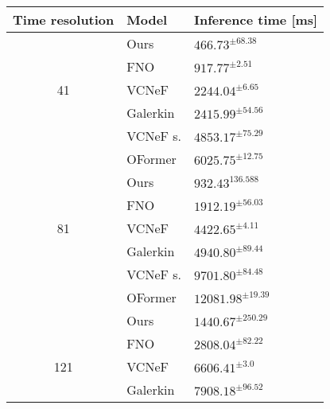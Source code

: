 \begin{table}[]
\begin{tabular}{|l|l|l|}
\hline
\multicolumn{1}{|l|}{Time resolution} & Model    & Inference time {[}ms{]}  \\ \hline
                                      & Ours     & $466.73^{\pm 68.38}$                             \\ \cline{2-3} 
                                      & FNO      & $917.77^{\pm 2.51}$                 \\ \cline{2-3} 
\multicolumn{1}{|c|}{41}               & VCNeF    & $2244.04^{\pm 6.65}$                 \\ \cline{2-3} 
                                      & Galerkin & $2415.99^{\pm 54.56}$                  \\ \cline{2-3} 
                                      & VCNeF s. & $4853.17^{\pm 75.29}$                 \\ \cline{2-3} 
\multicolumn{1}{|l|}{}                & OFormer  & $6025.75^{\pm 12.75}$                 \\ \hline
                                      & Ours     & $932.43^{136.588}$                            \\ \cline{2-3} 
                                      & FNO      & $1912.19^{\pm 56.03}$                    \\ \cline{2-3} 
\multicolumn{1}{|c|}{81}               & VCNeF    & $4422.65^{\pm 4.11}$                  \\ \cline{2-3} 
                                      & Galerkin & $4940.80^{\pm 89.44}$                 \\ \cline{2-3} 
                                      & VCNeF s. & $9701.80^{\pm 84.48}$                  \\ \cline{2-3} 
\multicolumn{1}{|l|}{}                & OFormer  & $12081.98^{\pm 19.39}$                   \\ \hline
                                      & Ours     & $1440.67^{\pm 250.29}$                          \\ \cline{2-3} 
                                      & FNO      & $2808.04^{\pm 82.22}$                     \\ \cline{2-3} 
\multicolumn{1}{|c|}{121}               & VCNeF    & $6606.41^{\pm 3.0}$                  \\ \cline{2-3} 
                                      & Galerkin & $7908.18^{\pm 96.52}$                   \\ \cline{2-3} 

\end{tabular}
\end{table}
